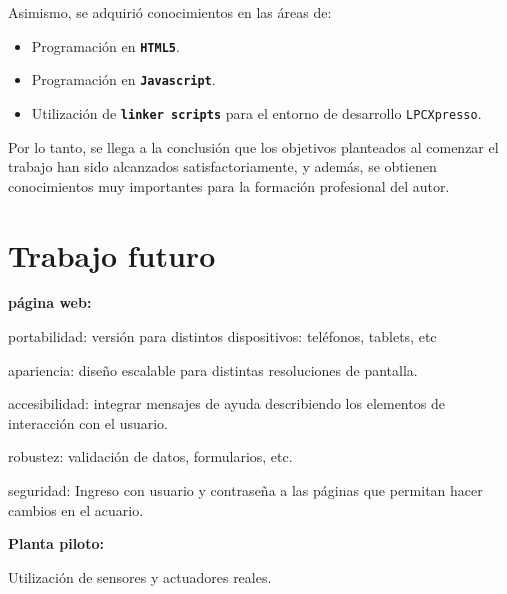 \medskip

\noindent Asimismo, se adquirió conocimientos en las áreas de:

\begin{itemize}
\item Programación en \textbf{\texttt{HTML5}}.
\item Programación en \textbf{\texttt{Javascript}}.  
\item Utilización de \textbf{\texttt{linker scripts}} para el entorno de desarrollo \texttt{LPCXpresso}.
\end{itemize}


\medskip

Por lo tanto, se llega a la conclusión que los objetivos planteados al comenzar el trabajo han sido alcanzados satisfactoriamente, y además, se obtienen conocimientos muy importantes para la formación profesional del autor.


\section{Trabajo futuro}

\textbf{página web:}

portabilidad: versión para distintos dispositivos: teléfonos, tablets, etc

apariencia: diseño escalable para distintas resoluciones de pantalla. 

accesibilidad: integrar mensajes de ayuda describiendo los elementos de interacción con el usuario.

robustez: validación de datos, formularios, etc. 

seguridad: Ingreso con usuario y contraseña a las páginas que permitan hacer cambios en el acuario.


\textbf{Planta piloto:}

Utilización de sensores y actuadores reales.




